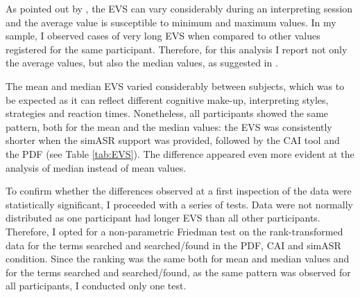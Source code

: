 As pointed out by \citet{alvstad_time_2011}, the EVS can vary considerably during an interpreting session and the average value is susceptible to minimum and maximum values. In my sample, I observed cases of very long EVS when compared to other values registered for the same participant. Therefore, for this analysis I report not only the average values, but also the median values, as suggested in \citet{alvstad_time_2011}.

The mean and median EVS varied considerably between subjects, which was to be expected as it can reflect different cognitive make-up, interpreting styles, strategies and reaction times. Nonetheless, all participants showed the same pattern, both for the mean and the median values: the EVS was consistently shorter when the simASR support was provided, followed by the CAI tool and the PDF (see Table \ref{tab:EVS}). The difference appeared even more evident at the analysis of median instead of mean values.

To confirm whether the differences observed at a first inspection of the data were statistically significant, I proceeded with a series of tests. Data were not normally distributed as one participant had longer EVS than all other participants. Therefore, I opted for a non-parametric Friedman test on the rank-transformed data for the terms searched and searched/found in the PDF, CAI and simASR condition. Since the ranking was the same both for mean and median values and for the terms searched and searched/found, as the same pattern was observed for all participants, I conducted only one test.

